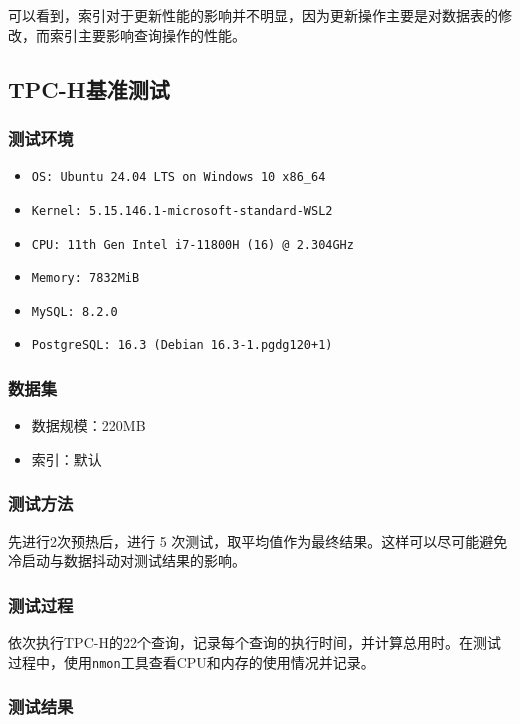 \documentclass{article}
\renewcommand\tt{\texttt}
\begin{document}
可以看到，索引对于更新性能的影响并不明显，因为更新操作主要是对数据表的修改，而索引主要影响查询操作的性能。

\subsection{TPC-H基准测试}

\subsubsection{测试环境}

\begin{itemize}[noitemsep]
  \item \tt{OS: Ubuntu 24.04 LTS on Windows 10 x86\_64}
  \item \tt{Kernel: 5.15.146.1-microsoft-standard-WSL2}
  \item \tt{CPU: 11th Gen Intel i7-11800H (16) @ 2.304GHz}
  \item \tt{Memory: 7832MiB}
  \item \tt{MySQL: 8.2.0}
  \item \tt{PostgreSQL: 16.3 (Debian 16.3-1.pgdg120+1)}
\end{itemize}

\subsubsection{数据集}

\begin{itemize}[noitemsep]
  \item 数据规模：220MB
  \item 索引：默认
\end{itemize}

\subsubsection{测试方法}

先进行2次预热后，进行 5 次测试，取平均值作为最终结果。这样可以尽可能避免冷启动与数据抖动对测试结果的影响。

\subsubsection{测试过程}

依次执行TPC-H的22个查询，记录每个查询的执行时间，并计算总用时。在测试过程中，使用\tt{nmon}工具查看CPU和内存的使用情况并记录。

\subsubsection{测试结果}
\end{document}
